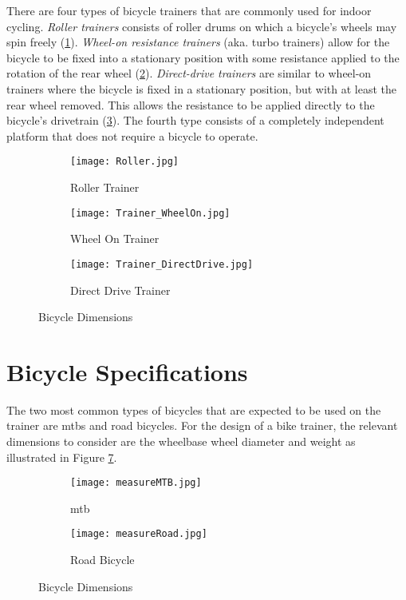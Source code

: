 There are four types of bicycle trainers that are commonly used for indoor cycling. \textit{Roller trainers} consists of roller drums on which a bicycle's wheels may spin freely (\ref{fig:roller}). \textit{Wheel-on resistance trainers} (aka. turbo trainers) allow for the bicycle to be fixed into a stationary position with some resistance applied to the rotation of the rear wheel (\ref{fig:wheelon}). \textit{Direct-drive trainers} are similar to wheel-on trainers where the bicycle is fixed in a stationary position, but with at least the rear wheel removed. This allows the resistance to be applied directly to the bicycle's drivetrain (\ref{fig:directdrive}). The fourth type consists of a completely independent platform that does not require a bicycle to operate. \citep{Alff:2011}

\begin{figure}[H]
	\centering
	\begin{subfigure}{.3\textwidth}
		\centering
		\texttt{[image: Roller.jpg]}
		\caption{Roller Trainer}
		\label{fig:roller}
	\end{subfigure}
	\hfill
	\begin{subfigure}{.3\textwidth}
		\centering
		\texttt{[image: Trainer\_WheelOn.jpg]}
		\caption{Wheel On Trainer}
		\label{fig:wheelon}
	\end{subfigure}
	\hfill
	\begin{subfigure}{.3\textwidth}
		\centering
		\texttt{[image: Trainer\_DirectDrive.jpg]}
		\caption{Direct Drive Trainer}
		\label{fig:directdrive}
	\end{subfigure}
	\caption{Bicycle Dimensions}
	\label{fig:trainers}
	\citep{Zwift:2022}
\end{figure}

\section{Bicycle Specifications}
\label{sec:specs}

The two most common types of bicycles that are expected to be used on the trainer are \acp{mtb} and road bicycles. For the design of a bike trainer, the relevant dimensions to consider are the wheelbase wheel diameter and weight as illustrated in Figure \ref{fig:bikeDim}.

\begin{figure}[H]
	\centering
	\begin{subfigure}{.5\textwidth}
		\centering
		\texttt{[image: measureMTB.jpg]}
		\caption{\ac{mtb} \citep[model by:][]{Pratama:2021}}
		\label{fig:sub1}
	\end{subfigure}%
	\begin{subfigure}{.5\textwidth}
		\centering
		\texttt{[image: measureRoad.jpg]}
		\caption{Road Bicycle \citep[model by:][]{Morozev:2017}}
		\label{fig:sub2}
	\end{subfigure}
	\caption{Bicycle Dimensions}
	\label{fig:bikeDim}
\end{figure}

